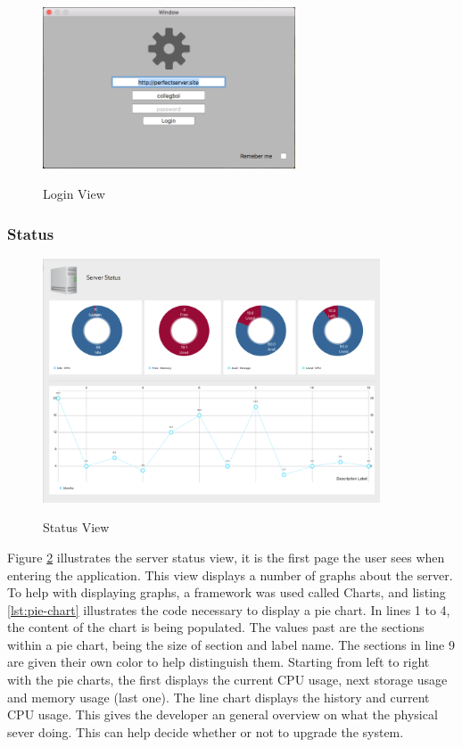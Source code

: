 \begin{figure}[!h]
    \caption{Login View}
    \centering
    \includegraphics[width=75mm]{images/dashboard/login}
    \label{fig:log-in-view}
\end{figure}

\subsubsection{Status}

\begin{figure}[!h]
    \caption{Status View}
    \centering
    \includegraphics[width=100mm]{images/dashboard/status}
    \label{fig:status-view}
\end{figure}
Figure \ref{fig:status-view} illustrates the server status view, it is the first page the user sees when entering the application. This view displays a number of graphs about the server. To help with displaying graphs, a framework was used called Charts, and listing \ref{lst:pie-chart} illustrates the code necessary to display a pie chart. In lines 1 to 4, the content of the chart is being populated. The values past are the sections within a pie chart, being the size of section and label name. The sections in line 9 are given their own color to help distinguish them.
Starting from left to right with the pie charts, the first displays the current CPU usage, next storage usage and memory usage (last one). The line chart displays the history and current CPU usage. This gives the developer an general overview on what the physical sever doing. This can help decide whether or not to upgrade the system.


